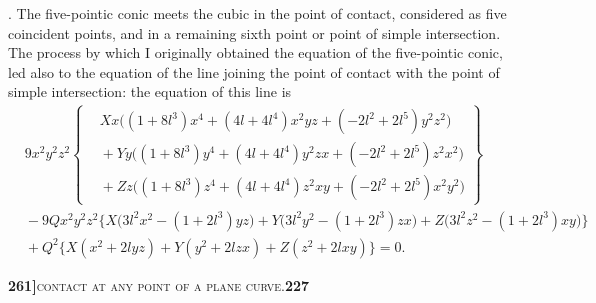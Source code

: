 \documentclass[11pt]{article}
\begin{document}
. The five-pointic conic meets the cubic in the point of contact, considered as five coincident points, and in a remaining sixth point or point of simple intersection. The process by which I originally obtained the equation of the five-pointic conic, led also to the equation of the line joining the point of contact with the point of simple intersection: the equation of this line is
\[
\begin{aligned}
&9x^2y^2z^2\left\{
\begin{aligned}
&Xx\bigl((1 + 8l^3)x^4 + (4l + 4l^4)x^2yz + (-2l^2 + 2l^5)y^2z^2\bigr)\\
&{}+ Yy\bigl((1 + 8l^3)y^4 + (4l + 4l^4)y^2zx + (-2l^2 + 2l^5)z^2x^2\bigr)\\
&{}+ Zz\bigl((1 + 8l^3)z^4 + (4l + 4l^4)z^2xy + (-2l^2 + 2l^5)x^2y^2\bigr)
\end{aligned}\right\}\\
&{} - 9Q x^2y^2z^2\bigl\{X\bigl(3l^2 x^2 - (1 + 2l^3)yz\bigr) + Y\bigl(3l^2 y^2 - (1 + 2l^3)zx\bigr) + Z\bigl(3l^2 z^2 - (1 + 2l^3)xy\bigr)\bigr\}\\
&{} + Q^2\bigl\{X(x^2 + 2lyz) + Y(y^2 + 2lzx) + Z(z^2 + 2lxy)\bigr\} = 0.
\end{aligned}
\]

\newpage

\noindent\textbf{261]}\hfill\textsc{contact at any point of a plane curve.}\hfill\textbf{227}

\medskip
\end{document}
